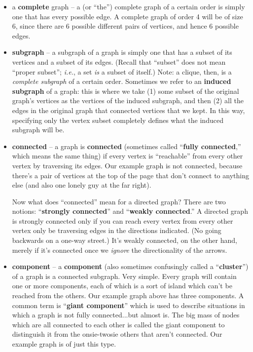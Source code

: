 \begin{itemize}
\item a \textbf{complete} graph -- a (or ``the'') complete graph of a certain
order is simply one that has every possible edge. A complete graph of order 4
will be of size 6, since there are 6 possible different pairs of vertices, and
hence 6 possible edges.

\item \textbf{subgraph} -- a subgraph of a graph is simply one that has a
subset of its vertices and a subset of its edges. (Recall that ``subset'' does
not mean ``proper subset''; \textit{i.e.}, a set \textit{is} a subset of
itself.) Note: a clique, then, is a \textit{complete subgraph} of a certain
order. Sometimes we refer to an \textbf{induced subgraph} of a graph: this is
where we take (1) some subset of the original graph's vertices as the vertices
of the induced subgraph, and then (2) all the edges in the original graph that
connected vertices that we kept. In this way, specifying only the vertex
subset completely defines what the induced subgraph will be.

\item \textbf{connected} -- a graph is \textbf{connected} (sometimes called
``\textbf{fully connected},'' which means the same thing) if every vertex is
``reachable'' from every other vertex by traversing its edges. Our example
graph is not connected, because there's a pair of vertices at the top of the
page that don't connect to anything else (and also one lonely guy at the far
right).

Now what does ``connected'' mean for a directed graph? There are two notions:
``\textbf{strongly connected}'' and ``\textbf{weakly connected}.'' A directed
graph is strongly connected only if you can reach every vertex from every
other vertex only be traversing edges in the directions indicated. (No going
backwards on a one-way street.) It's weakly connected, on the other hand,
merely if it's connected once we \textit{ignore} the directionality of the
arrows.

\item \textbf{component} -- a \textbf{component} (also sometimes confusingly
called a ``\textbf{cluster}'') of a graph is a connected subgraph. Very simple.
Every graph will contain one or more components, each of which is a sort of
island which can't be reached from the others. Our example graph above has
three components. A common term is ``\textbf{giant component}'' which is used
to describe situations in which a graph is not fully connected...but almost
is. The big mass of nodes which are all connected to each other is called the
giant component to distinguish it from the onsie-twosie others that aren't
connected. Our example graph is of just this type.


\end{itemize}
